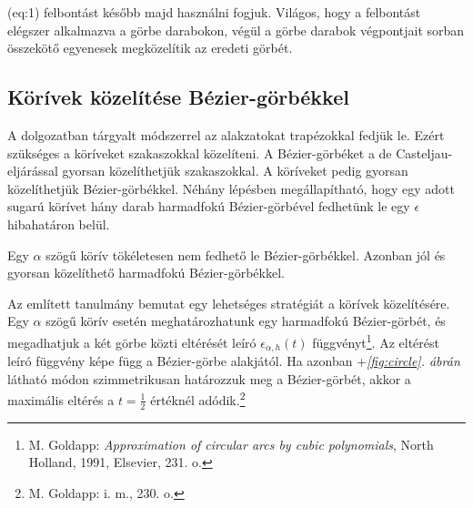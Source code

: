\documentclass[12pt]{report}
\theoremstyle{definition}
\begin{document}
\Aref({eq:1}) felbontást később majd használni fogjuk. Világos, hogy a
felbontást elégszer alkalmazva a görbe darabokon, végül a görbe darabok
végpontjait sorban összekötő egyenesek megközelítik az eredeti görbét.

    \subsection*{Körívek közelítése Bézier-görbékkel}
    \label{sec:arctobezier}

A dolgozatban tárgyalt módszerrel az alakzatokat trapézokkal fedjük le. Ezért
szükséges a köríveket szakaszokkal közelíteni. A Bézier-görbéket a de
Casteljau-eljárással gyorsan közelíthetjük szakaszokkal. A köríveket pedig
gyorsan közelíthetjük Bézier-görbékkel. Néhány lépésben megállapítható, hogy
egy adott sugarú körívet hány darab harmadfokú Bézier-görbével fedhetünk le
egy $\epsilon$ hibahatáron belül.

Egy $\alpha$ szögű körív tökéletesen nem fedhető le
Bézier-görbékkel\cite[Goldapp]{Goldapp:1991:approximation}. Azonban jól és
gyorsan közelíthető harmadfokú Bézier-görbékkel.

Az említett \cite[Goldapp]{Goldapp:1991:approximation} tanulmány bemutat egy
lehetséges stratégiát a körívek közelítésére. Egy $\alpha$ szögű körív
esetén meghatározhatunk egy harmadfokú Bézier-görbét, és megadhatjuk a két
görbe közti eltérését leíró $\epsilon_{\alpha,h}(t)$ függvényt\footnote{M.
Goldapp: \emph{Approximation of circular arcs by cubic polynomials}, North
Holland, 1991, Elsevier, 231. o.}. Az eltérést leíró függvény képe függ a
Bézier-görbe alakjától. Ha azonban \az+\emph{\ref{fig:circle}. ábrán} látható
módon szimmetrikusan határozzuk meg a Bézier-görbét, akkor a maximális eltérés
a $t=\frac{1}{2}$ értéknél adódik.\footnote{M. Goldapp: i. m., 230. o.}
\end{document}
